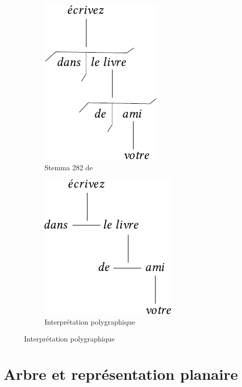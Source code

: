 {    \begin{figure}[H]
    \caption{Interprétation polygraphique d'un stemma}
    \begin{subfigure}[b]{.5\textwidth}\centering
    \includegraphics[scale=.9]{figures/polygraphs/poly-3.3.5-1.pdf}
    \caption{Stemma 282 de \citet{tesniere1959elements}}
    \end{subfigure}%
    \begin{subfigure}[b]{.5\textwidth}\centering
    \includegraphics[scale=.9]{figures/polygraphs/poly-3.3.5-2.pdf}
    \caption{Interprétation polygraphique}
    \end{subfigure}
    \end{figure}
}

\section{Arbre et représentation planaire}\label{sec:3.3.6}

